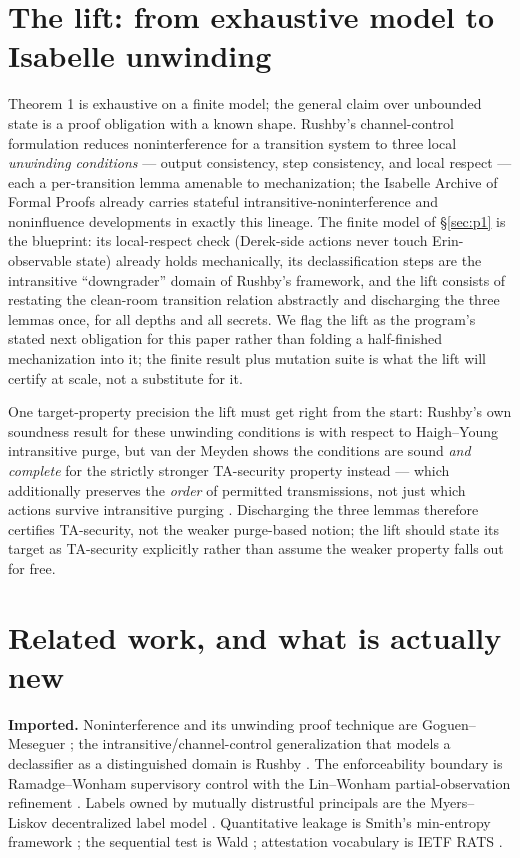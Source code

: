 \documentclass[11pt,a4paper]{article}
\begin{document}
\section{The lift: from exhaustive model to Isabelle unwinding}\label{sec:lift}

Theorem 1 is exhaustive on a finite model; the general claim over unbounded state is a proof obligation with a known shape.
Rushby's channel-control formulation \cite{rushby} reduces noninterference for a transition system to three local \emph{unwinding
conditions} --- output consistency, step consistency, and local respect --- each a per-transition lemma amenable to mechanization;
the Isabelle Archive of Formal Proofs already carries stateful intransitive-noninterference and noninfluence developments in
exactly this lineage. The finite model of \S\ref{sec:p1} is the blueprint: its local-respect check (Derek-side actions never touch
Erin-observable state) already holds mechanically, its declassification steps are the intransitive ``downgrader'' domain of
Rushby's framework, and the lift consists of restating the clean-room transition relation abstractly and discharging the three
lemmas once, for all depths and all secrets. We flag the lift as the program's stated next obligation for this paper rather than
folding a half-finished mechanization into it; the finite result plus mutation suite is what the lift will certify at scale, not a
substitute for it.

One target-property precision the lift must get right from the start: Rushby's own soundness result for these unwinding
conditions is with respect to Haigh--Young intransitive purge, but van der Meyden shows the conditions are sound \emph{and
complete} for the strictly stronger TA-security property instead --- which additionally preserves the \emph{order} of
permitted transmissions, not just which actions survive intransitive purging \cite{vdm07}. Discharging the three lemmas
therefore certifies TA-security, not the weaker purge-based notion; the lift should state its target as TA-security explicitly
rather than assume the weaker property falls out for free.

\section{Related work, and what is actually new}\label{sec:related}

\textbf{Imported.} Noninterference and its unwinding proof technique are Goguen--Meseguer
\cite{goguen-meseguer-82,goguen-meseguer-84}; the intransitive/channel-control generalization that models a declassifier as a
distinguished domain is Rushby \cite{rushby}. The enforceability boundary is Ramadge--Wonham supervisory control
\cite{ramadge-wonham} with the Lin--Wonham partial-observation refinement \cite{lin-wonham}. Labels owned by mutually distrustful
principals are the Myers--Liskov decentralized label model \cite{myers-liskov}. Quantitative leakage is Smith's min-entropy
framework \cite{smith-qif}; the sequential test is Wald \cite{wald,wald-wolfowitz}; attestation vocabulary is IETF RATS
\cite{rats}.
\end{document}
